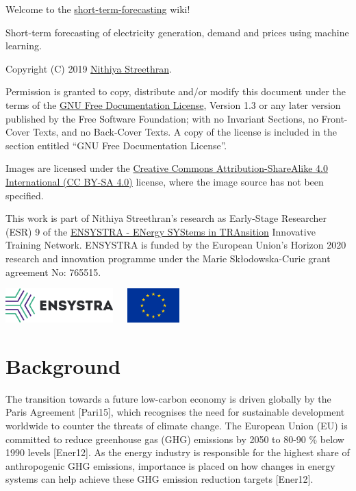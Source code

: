 Welcome to the
\href{https://github.com/ENSYSTRA/short-term-forecasting}{short-term-forecasting}
wiki!

Short-term forecasting of electricity generation, demand and prices
using machine learning.

Copyright (C) 2019 \href{https://nmstreethran.github.io/}{Nithiya
Streethran}.

Permission is granted to copy, distribute and/or modify this document
under the terms of the \href{https://www.gnu.org/licenses/fdl-1.3}{GNU
Free Documentation License}, Version 1.3 or any later version published
by the Free Software Foundation; with no Invariant Sections, no
Front-Cover Texts, and no Back-Cover Texts. A copy of the license is
included in the section entitled ``GNU Free Documentation License''.

Images are licensed under the
\href{https://creativecommons.org/licenses/by-sa/4.0/}{Creative Commons
Attribution-ShareAlike 4.0 International (CC BY-SA 4.0)} license, where
the image source has not been specified.

This work is part of Nithiya Streethran's research as Early-Stage
Researcher (ESR) 9 of the \href{https://ensystra.eu/}{ENSYSTRA - ENergy
SYStems in TRAnsition} Innovative Training Network. ENSYSTRA is funded
by the European Union's Horizon 2020 research and innovation programme
under the Marie Skłodowska-Curie grant agreement No: 765515.

\href{https://ensystra.eu/}{\includegraphics[width=\textwidth,height=0.52083in]{logos/ensystra-ls.png}}~~~\includegraphics[width=\textwidth,height=0.52083in]{logos/eu.jpg}

\hypertarget{background}{%
\section{Background}\label{background}}

The transition towards a future low-carbon economy is driven globally by
the Paris Agreement {[}Pari15{]}, which recognises the need for
sustainable development worldwide to counter the threats of climate
change. The European Union (EU) is committed to reduce greenhouse gas
(GHG) emissions by 2050 to 80-90 \% below 1990 levels {[}Ener12{]}. As
the energy industry is responsible for the highest share of
anthropogenic GHG emissions, importance is placed on how changes in
energy systems can help achieve these GHG emission reduction targets
{[}Ener12{]}.

